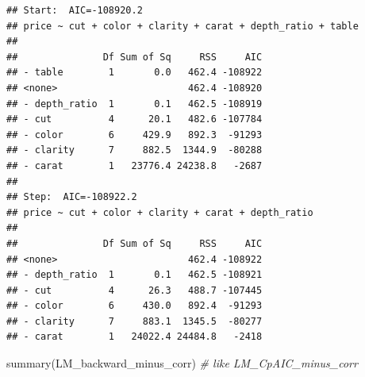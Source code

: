 \documentclass[
]{article}
\newenvironment{Shaded}{\begin{snugshade}}{\end{snugshade}}
\newcommand{\CommentTok}[1]{\textcolor[rgb]{0.56,0.35,0.01}{\textit{#1}}}
\newcommand{\FunctionTok}[1]{\textcolor[rgb]{0.00,0.00,0.00}{#1}}
\newcommand{\NormalTok}[1]{#1}
\begin{document}
\begin{verbatim}
## Start:  AIC=-108920.2
## price ~ cut + color + clarity + carat + depth_ratio + table
## 
##               Df Sum of Sq     RSS     AIC
## - table        1       0.0   462.4 -108922
## <none>                       462.4 -108920
## - depth_ratio  1       0.1   462.5 -108919
## - cut          4      20.1   482.6 -107784
## - color        6     429.9   892.3  -91293
## - clarity      7     882.5  1344.9  -80288
## - carat        1   23776.4 24238.8   -2687
## 
## Step:  AIC=-108922.2
## price ~ cut + color + clarity + carat + depth_ratio
## 
##               Df Sum of Sq     RSS     AIC
## <none>                       462.4 -108922
## - depth_ratio  1       0.1   462.5 -108921
## - cut          4      26.3   488.7 -107445
## - color        6     430.0   892.4  -91293
## - clarity      7     883.1  1345.5  -80277
## - carat        1   24022.4 24484.8   -2418
\end{verbatim}

\begin{Shaded}
\begin{Highlighting}[]
\FunctionTok{summary}\NormalTok{(LM\_backward\_minus\_corr)   }\CommentTok{\# like LM\_CpAIC\_minus\_corr}
\end{Highlighting}
\end{Shaded}
\end{document}
